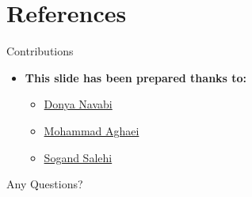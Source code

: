 \documentclass[serif, aspectratio=169]{beamer}
\begin{document}
\section{References}

\begin{frame}{Contributions}
\begin{itemize}
\item \textbf{This slide has been prepared thanks to:}
\begin{itemize}
    \setlength{\itemsep}{10pt} %
    \item \href{https://github.com/DnyaNvB/}{Donya Navabi}
    \item \href{https://github.com/mohmmadweb}{Mohammad Aghaei}
    \item \href{https://github.com/sogandstormesalehi/}{Sogand Salehi}
\end{itemize}
\end{itemize}

\end{frame}
\begin{frame}[allowframebreaks]
    
    
    \nocite{*} %
\end{frame}


\begin{frame}
    \begin{center}
        {\Huge Any Questions?}
    \end{center}
\end{frame}
\end{document}
